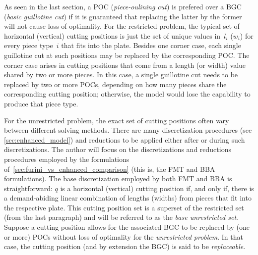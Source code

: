 \documentclass[ppgc,tese,english,formais,babel]{iiufrgs}
\begin{document}
As seen in the last section, a POC (\emph{piece-oulining cut}) is prefered over a BGC (\emph{basic guillotine cut}) if it is guaranteed that replacing the latter by the former will not cause loss of optimality.
For the restricted problem, the typical set of horizontal (vertical) cutting positions is just the set of unique values in~\(l_i\) (\(w_i\)) for every piece type~\(i\) that fits into the plate.
Besides one corner case, each single guillotine cut at such positions may be replaced by the corresponding POC.
The corner case arises in cutting positions that come from a length (or width) value shared by two or more pieces.
In this case, a single guillotine cut needs to be replaced by two or more POCs, depending on how many pieces share the corresponding cutting position; otherwise, the model would lose the capability to produce that piece type.

For the unrestricted problem, the exact set of cutting positions often vary between different solving methods.
There are many discretization procedures (see \cref{sec:enhanced_model}) and reductions to be applied either after or during such discretizations.
The author will focus on the discretizations and reductions procedures employed by the formulations of~\cref{sec:furini_vs_enhanced_comparison} (this is, the FMT and BBA formulations).
The base discretization employed by both FMT and BBA is straightforward: \(q\) is a horizontal (vertical) cutting position if, and only if, there is a demand-abiding linear combination of lengths (widths) from pieces that fit into the respective plate.
This cutting position set is a superset of the restricted set (from the last paragraph) and will be referred to as the \emph{base unrestricted set}.
Suppose a cutting position allows for the associated BGC to be replaced by (one or more) POCs without loss of optimality for the \emph{unrestricted problem}.
In that case, the cutting position (and by extension the BGC) is said to be \emph{replaceable}.
\end{document}
